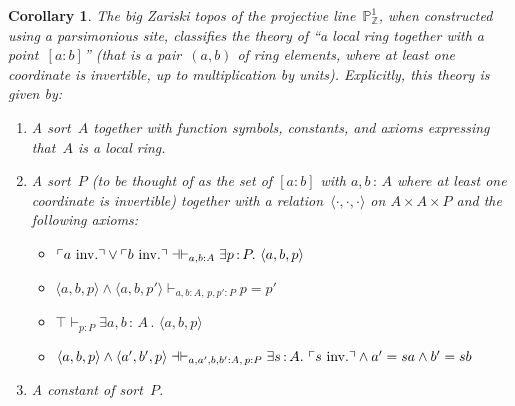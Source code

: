 \documentclass[10pt,reqno,a4paper]{amsbook}
\makeatletter
\theoremstyle{definition}
\theoremstyle{plain}
\newtheorem{cor}[defn]{Corollary}
\theoremstyle{remark}
\newcommand{\ZZ}{\mathbb{Z}}
\newcommand{\PP}{\mathbb{P}}
\newcommand{\?}{\,{:}\,}
\newcommand{\hg}{\mathbin{:}}  %
\renewcommand{\_}{\mathpunct{.}\,}
\newcommand{\speak}[1]{\ulcorner\text{\textnormal{#1}}\urcorner}
\newcommand{\inv}{inv.\@}
\makeatother
\begin{document}
\begin{cor}\label{cor:pp1-classifies}
The big Zariski topos of the projective line~$\PP^1_\ZZ$, when constructed using a parsimonious site, classifies the theory of ``a local
ring together with a point~$[a \hg b]$'' (that is a pair~$(a,b)$ of ring elements,
where at least one coordinate is invertible, up to multiplication by units).
Explicitly, this theory is given by:
\begin{enumerate}
\item A sort~$A$ together with function symbols, constants, and axioms expressing
that~$A$ is a local ring.
\item A sort~$P$ (to be thought of as the set of $[a \hg b]$ with $a,b\?A$ where at
least one coordinate is invertible) together with a
relation~$\langle\cdot,\cdot,\cdot\rangle$ on $A \times A \times P$ and the
following axioms:
\begin{itemize}
\item $\speak{$a$ \inv} \vee \speak{$b$ \inv}
\dashv\vdash_{a,b{:}A} \exists p\?P\_ \langle a,b,p \rangle$
\item $\langle a,b,p \rangle \wedge \langle a,b,p' \rangle
\vdash_{a,b{:}A,\,p,p'{:}P} p = p'$
\item $\top \vdash_{p{:}P} \exists a,b\?A\_ \langle a,b,p \rangle$
\item $\langle a,b,p \rangle \wedge \langle a',b',p \rangle
\dashv\vdash_{a,a',b,b'{:}A,\, p{:}P} \exists s\?A\_ \speak{$s$ \inv} \wedge a' = s a \wedge b' = s b$
\end{itemize}
\item A constant of sort~$P$.
\end{enumerate}
\end{cor}
\end{document}
